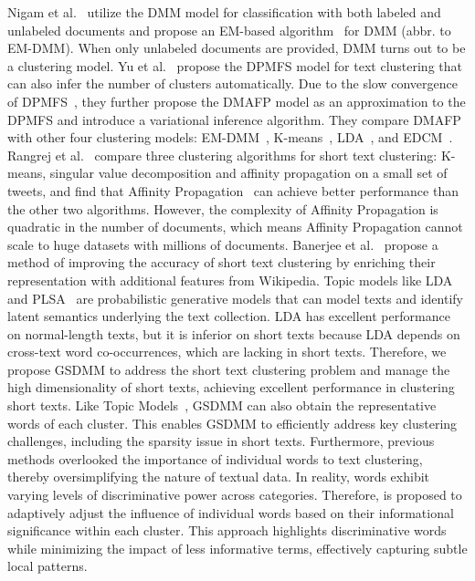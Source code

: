 Nigam et al.~\cite{nigam2000text} utilize the DMM model for classification with both labeled and unlabeled documents and propose an EM-based algorithm~\cite{nigam2000text} for DMM (abbr. to EM-DMM). When only unlabeled documents are provided, DMM turns out to be a clustering model. Yu et al.~\cite{YuDPM:KDD2010} propose the DPMFS model for text clustering that can also infer the number of clusters automatically. Due to the slow convergence of DPMFS~\cite{DBLP:journals/tkde/HuangYWZS13}, they further propose the DMAFP model as an approximation to the DPMFS and introduce a variational inference algorithm. They compare DMAFP with other four clustering models: EM-DMM~\cite{nigam2000text}, K-means~\cite{jain2010K-means}, LDA~\cite{Blei:LDA2003}, and EDCM~\cite{DCMelkan2006clustering}. Rangrej et al.~\cite{Rangrej:WWW2011} compare three clustering algorithms for short text clustering: K-means, singular value decomposition and affinity propagation on a small set of tweets, and find that Affinity Propagation~\cite{frey2007clustering} can achieve better performance than the other two algorithms. However, the complexity of Affinity Propagation is quadratic in the number of documents, which means Affinity Propagation cannot scale to huge datasets with millions of documents.
Banerjee et al.~\cite{Banerjee:SIGIR2007} propose a method of improving the accuracy of short text clustering by enriching their representation with additional features from Wikipedia. Topic models like LDA~\cite{Blei:LDA2003} and PLSA~\cite{hofmann1999probabilistic} are probabilistic generative models that can model texts and identify latent semantics underlying the text collection. 
LDA has excellent performance on normal-length texts, but it is inferior on short texts because LDA depends on cross-text word co-occurrences, which are lacking in short texts. 
Therefore, we propose GSDMM to address the short text clustering problem and manage the high dimensionality of short texts, achieving excellent performance in clustering short texts. Like Topic Models~\cite{Blei:LDA2003}, GSDMM can also obtain the representative words of each cluster. This enables GSDMM to efficiently address key clustering challenges, including the sparsity issue in short texts. Furthermore, previous methods overlooked the importance of individual words to text clustering, thereby oversimplifying the nature of textual data. In reality, words exhibit varying levels of discriminative power across categories. Therefore, \sysname{} is proposed to adaptively adjust the influence of individual words based on their informational significance within each cluster. This approach highlights discriminative words while minimizing the impact of less informative terms, effectively capturing subtle local patterns.

